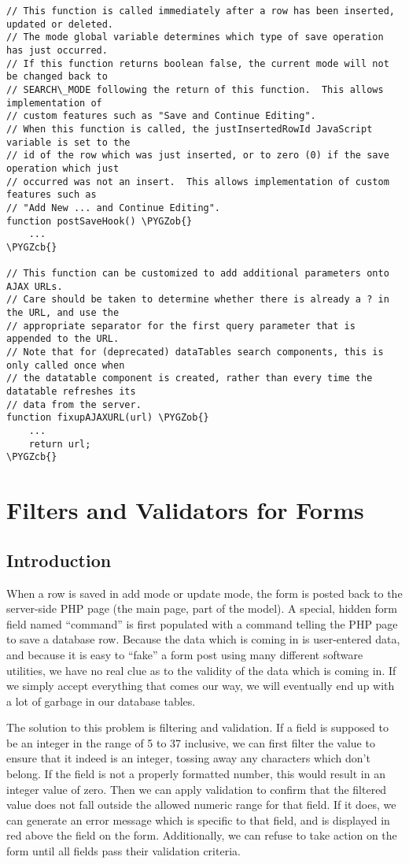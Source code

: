 \documentclass[letterpaper,10pt,english]{sphinxmanual}
\def\PYGZob{\char`\{}
\def\PYGZcb{\char`\}}
\begin{document}
\begin{Verbatim}[commandchars=\\\{\}]
// This function is called immediately after a row has been inserted, updated or deleted.
// The mode global variable determines which type of save operation has just occurred.
// If this function returns boolean false, the current mode will not be changed back to
// SEARCH\_MODE following the return of this function.  This allows implementation of
// custom features such as "Save and Continue Editing".
// When this function is called, the justInsertedRowId JavaScript variable is set to the
// id of the row which was just inserted, or to zero (0) if the save operation which just
// occurred was not an insert.  This allows implementation of custom features such as
// "Add New ... and Continue Editing".
function postSaveHook() \PYGZob{}
    ...
\PYGZcb{}

// This function can be customized to add additional parameters onto AJAX URLs.
// Care should be taken to determine whether there is already a ? in the URL, and use the
// appropriate separator for the first query parameter that is appended to the URL.
// Note that for (deprecated) dataTables search components, this is only called once when
// the datatable component is created, rather than every time the datatable refreshes its
// data from the server.
function fixupAJAXURL(url) \PYGZob{}
    ...
    return url;
\PYGZcb{}
\end{Verbatim}


\chapter{Filters and Validators for Forms}
\label{jaxFrameworkGuide:filters-and-validators-for-forms}

\section{Introduction}
\label{jaxFrameworkGuide:id22}
When a row is saved in add mode or update mode, the form is posted back to the server-side PHP page
(the main page, part of the model).  A special, hidden form field named ``command'' is first populated
with a command telling the PHP page to save a database row.  Because the data which is coming in is
user-entered data, and because it is easy to ``fake'' a form post using many different software
utilities, we have no real clue as to the validity of the data which is coming in.  If we simply
accept everything that comes our way, we will eventually end up with a lot of garbage in our
database tables.

The solution to this problem is filtering and validation.  If a field is supposed to be an integer
in the range of 5 to 37 inclusive, we can first filter the value to ensure that it indeed is an
integer, tossing away any characters which don't belong.  If the field is not a properly formatted
number, this would result in an integer value of zero.  Then we can apply validation to confirm that
the filtered value does not fall outside the allowed numeric range for that field.  If it does, we
can generate an error message which is specific to that field, and is displayed in red above the
field on the form.  Additionally, we can refuse to take action on the form until all fields pass
their validation criteria.
\end{document}
